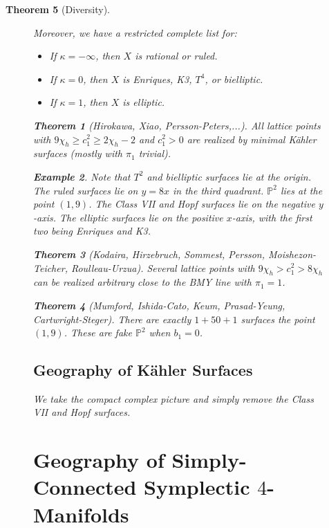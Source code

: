 \documentclass[leqno, openany]{memoir}
\newtheorem{thm}{Theorem}[chapter]
\theoremstyle{definition}
\newtheorem{exm}[thm]{Example}
\theoremstyle{remark}
\theoremstyle{plain}
\theoremstyle{definition}
\theoremstyle{remark}
\renewcommand{\P}{\mathbb{P}}
\begin{document}
\begin{thm}[Diversity]
\begin{figure}[H]
Moreover, we have a restricted \textit{complete} list for: \begin{itemize}
    \item If $\kappa = -\infty$, then $X$ is rational or ruled.  \item If
        $\kappa = 0$, then $X$ is Enriques, K3, $T^4$, or bielliptic.  \item If
        $\kappa = 1$, then $X$ is elliptic.  \end{itemize}

\begin{thm}[Hirokawa, Xiao, Persson-Peters,...] All lattice points with $9
\chi_h \geq c_1^2 \geq 2 \chi_h - 2$ and $c_1^2 > 0$ are realized by minimal
K\"ahler surfaces (mostly with $\pi_1$ trivial).  \end{thm}

\begin{exm} Note that $T^2$ and bielliptic surfaces lie at the origin. The
    ruled surfaces lie on $y = 8x$ in the third quadrant. $\P^2$ lies at the
    point $(1,9)$. The Class VII and Hopf surfaces lie on the negative
    $y$-axis. The elliptic surfaces lie on the positive $x$-axis, with the
    first two being Enriques and K3.  \end{exm}

\begin{thm}[Kodaira, Hirzebruch, Sommest, Persson, Moishezon-Teicher,
Roulleau-Urzua] Several lattice points with $9 \chi_h > c_1^2 > 8 \chi_h$ can
be realized arbitrary close to the BMY line with $\pi_1 = 1$.  \end{thm}

\begin{thm}[Mumford, Ishida-Cato, Keum, Prasad-Yeung, Cartwright-Steger] There
are exactly $1 + 50 + 1$ surfaces the point $(1,9)$. These are fake $\P^2$ when
$b_1 = 0$.  \end{thm}

\subsection{Geography of K\"ahler Surfaces}%
\label{sub:geography_of_k"ahler_surfaces}

We take the compact complex picture and simply remove the Class VII and Hopf
surfaces.

\section{Geography of Simply-Connected Symplectic $4$-Manifolds}%
\label{sec:geography_of_simply_connected_symplectic_4_manifolds}


\end{figure}
\end{thm}
\end{document}
